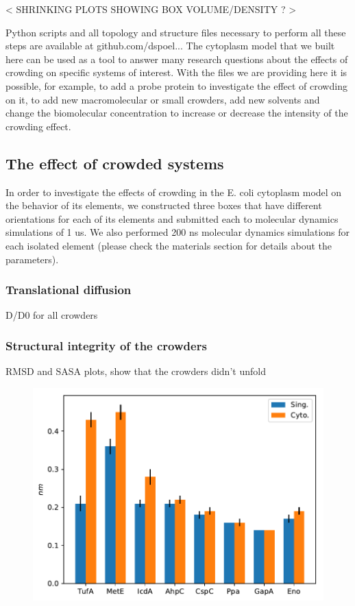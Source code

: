 \documentclass[journal=jacsat,manuscript=article]{achemso}
\begin{document}
< SHRINKING PLOTS SHOWING BOX VOLUME/DENSITY ? >


Python scripts and all topology and structure files necessary to perform all these steps are available at github.com/dspoel... The cytoplasm model that we built here can be used as a tool to answer many research questions about the effects of crowding on specific systems of interest. With the files we are providing here it is possible, for example, to add a probe protein to investigate the effect of crowding on it, to add new macromolecular or small crowders, add new solvents and change the biomolecular concentration to increase or decrease the intensity of the crowding effect.
 


\subsection{The effect of crowded systems}

In order to investigate the effects of crowding in the E. coli cytoplasm model on the behavior of its elements, we constructed three boxes that have different orientations for each of its elements and submitted each to molecular dynamics simulations of 1 us. We also performed 200 ns molecular dynamics simulations for each isolated element (please check the materials section for details about the parameters).

\subsubsection{Translational diffusion}
D/D0 for all crowders

\subsubsection{Structural integrity of the crowders}
RMSD and SASA plots, show that the crowders didn't unfold
\begin{figure}
\includegraphics[scale=0.6]{rmsd.pdf}
\end{figure}
\end{document}
